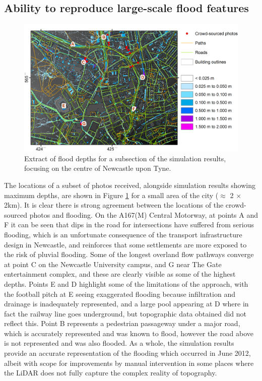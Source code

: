 \subsection{Ability to reproduce large-scale flood features}

\begin{figure}[tbp]
	\centering
	\includegraphics[width=1.0\textwidth]{newcastle-pluvial-figures/centre-depth-lettered.png}
	\caption{Extract of flood depths for a subsection of the simulation results, focusing on the centre of Newcastle upon Tyne.}
	\label{Newcastle_Centre_Depths}
\end{figure}

The locations of a subset of photos received, alongside simulation results showing maximum depths, are shown in Figure \ref{Newcastle_Centre_Depths} for a small area of the city ($\approx$ 2 $\times$ 2km). It is clear there is strong agreement between the locations of the crowd-sourced photos and flooding. On the A167(M) Central Motorway, at points A and F it can be seen that dips in the road for intersections have suffered from serious flooding, which is an unfortunate consequence of the transport infrastructure design in Newcastle, and reinforces that some settlements are more exposed to the risk of pluvial flooding. Some of the longest overland flow pathways converge at point C on the Newcastle University campus, and G near The Gate entertainment complex, and these are clearly visible as some of the highest depths. Points E and D highlight some of the limitations of the approach, with the football pitch at E seeing exaggerated flooding because infiltration and drainage is inadequately represented, and a large pool appearing at D where in fact the railway line goes underground, but topographic data obtained did not reflect this. Point B represents a pedestrian passageway under a major road, which is accurately represented and was known to flood, however the road above is not represented and was also flooded. As a whole, the simulation results provide an accurate representation of the flooding which occurred in June 2012, albeit with scope for improvements by manual intervention in some places where the LiDAR does not fully capture the complex reality of topography.

